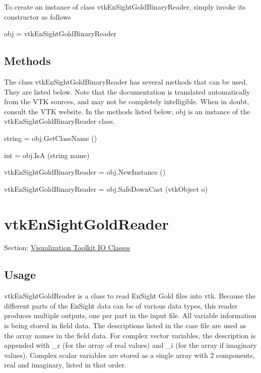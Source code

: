 To create an instance of class vtk\-En\-Sight\-Gold\-Binary\-Reader, simply invoke its constructor as follows \begin{DoxyVerb}  obj = vtkEnSightGoldBinaryReader
\end{DoxyVerb}
 \hypertarget{vtkwidgets_vtkxyplotwidget_Methods}{}\subsection{Methods}\label{vtkwidgets_vtkxyplotwidget_Methods}
The class vtk\-En\-Sight\-Gold\-Binary\-Reader has several methods that can be used. They are listed below. Note that the documentation is translated automatically from the V\-T\-K sources, and may not be completely intelligible. When in doubt, consult the V\-T\-K website. In the methods listed below, {\ttfamily obj} is an instance of the vtk\-En\-Sight\-Gold\-Binary\-Reader class. 
\begin{DoxyItemize}
\item {\ttfamily string = obj.\-Get\-Class\-Name ()}  
\item {\ttfamily int = obj.\-Is\-A (string name)}  
\item {\ttfamily vtk\-En\-Sight\-Gold\-Binary\-Reader = obj.\-New\-Instance ()}  
\item {\ttfamily vtk\-En\-Sight\-Gold\-Binary\-Reader = obj.\-Safe\-Down\-Cast (vtk\-Object o)}  
\end{DoxyItemize}\hypertarget{vtkio_vtkensightgoldreader}{}\section{vtk\-En\-Sight\-Gold\-Reader}\label{vtkio_vtkensightgoldreader}
Section\-: \hyperlink{sec_vtkio}{Visualization Toolkit I\-O Classes} \hypertarget{vtkwidgets_vtkxyplotwidget_Usage}{}\subsection{Usage}\label{vtkwidgets_vtkxyplotwidget_Usage}
vtk\-En\-Sight\-Gold\-Reader is a class to read En\-Sight Gold files into vtk. Because the different parts of the En\-Sight data can be of various data types, this reader produces multiple outputs, one per part in the input file. All variable information is being stored in field data. The descriptions listed in the case file are used as the array names in the field data. For complex vector variables, the description is appended with \-\_\-r (for the array of real values) and \-\_\-i (for the array if imaginary values). Complex scalar variables are stored as a single array with 2 components, real and imaginary, listed in that order.

